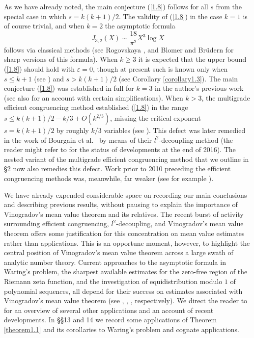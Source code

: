 \documentclass[12pt,reqno]{amsart}
\theoremstyle{definition}
\theoremstyle{remark}
\numberwithin{equation}{section}
\def\eps{\varepsilon}
\def\le{\leqslant} \def\ge{\geqslant} \def\pleq{\preccurlyeq} \def\ple{\prec}
\begin{document}
As we have already noted, the main conjecture (\ref{1.8}) follows for all $s$ from the 
special case in which $s=k(k+1)/2$. The validity of (\ref{1.8}) in the case $k=1$ is of 
course trivial, and when $k=2$ the asymptotic formula
$$J_{3,2}(X)\sim \frac{18}{\pi^2}X^3\log X$$
follows via classical methods (see Rogovskaya \cite{Rog1986}, and Blomer and 
Br\"udern \cite{BB2010} for sharp versions of this formula). When $k\ge 3$ it is expected 
that the upper bound (\ref{1.8}) should hold with $\eps=0$, though at present such is 
known only when $s\le k+1$ (see \cite[Theorem 1]{VW1997}) and $s>k(k+1)/2$ (see 
Corollary \ref{corollary1.3}). The main conjecture (\ref{1.8}) was established in full for 
$k=3$ in the author's previous work 
\cite[Theorem 1.1, Theorem 8.1 and its proof]{Woo2016} (see also \cite{HB2015} for an 
account with certain simplifications). When $k>3$, the multigrade efficient congruencing 
method established (\ref{1.8}) in the range 
$s\le k(k+1)/2-k/3+O(k^{2/3})$, missing the critical exponent $s=k(k+1)/2$ by roughly 
$k/3$ variables (see \cite[Theorem 1.3]{Woo2017}). This defect was later remedied in the 
work of Bourgain et al.~\cite{BDG2016} by means of their $l^2$-decoupling method (the 
reader might refer to \cite{Pie2017} for the status of developments at the end of 2016). The 
nested variant of the multigrade efficient congruencing method that we outline in \S2 now 
also remedies this defect. Work prior to 2010 preceding the efficient congruencing methods 
was, meanwhile, far weaker (see for example \cite{Hua1965, Vin1947, Woo1992}).\par

We have already expended considerable space on recording our main conclusions and 
describing previous results, without pausing to explain the importance of Vinogradov's mean 
value theorem and its relatives. The recent burst of activity surrounding efficient 
congruencing, $l^2$-decoupling, and Vinogradov's mean value theorem offers some 
justification for this concentration on mean value estimates rather than applications. This 
is an opportune moment, however, to highlight the central position of Vinogradov's mean 
value theorem across a large swath of analytic number theory. Current approaches to the 
asymptotic formula in Waring's problem, the sharpest available estimates for the zero-free 
region of the Riemann zeta function, and the investigation of equidistribution modulo $1$ of 
polynomial sequences, all depend for their success on estimates associated with 
Vinogradov's mean value theorem (see \cite{Bou2017, Woo2012b}, \cite{For2002}, 
\cite{Bak1986, Woo2016a}, respectively). We direct the reader to \cite{Woo2014a} for an 
overview of several other applications and an account of recent developments. In \S\S13 and 
14 we record some applications of Theorem \ref{theorem1.1} and its corollaries to Waring's 
problem and cognate applications.\par
\end{document}
